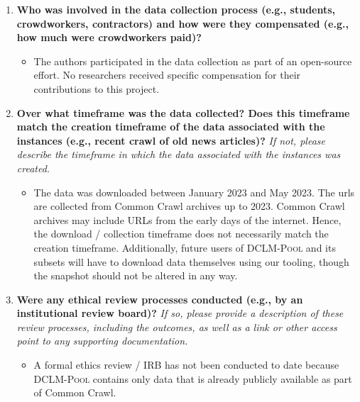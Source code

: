 \documentclass{article}
\newcommand{\rawpool}{\textsc{DCLM-Pool}\xspace}
\newcommand{\commoncrawl}{Common Crawl\xspace}
\begin{document}
\begin{enumerate}[label=Q\arabic*, resume]
\begin{itemize}
\item \rawpool is not a probabilistic sample. As described in Q7, \rawpool contains all data from \commoncrawl before 2023. \commoncrawl is a sample of the Web, and we refer to \commoncrawl documentation for details of their sampling process. Our competition pools for the various scales however are fixed subsets from \rawpool, formed by randomly subsetting \rawpool / Common Crawl paths.
\end{itemize}

\item \textbf{Who was involved in the data collection process (e.g., students, crowdworkers, contractors) and how were they compensated (e.g., how much were crowdworkers paid)?}

\begin{itemize}
\item The authors participated in the data collection as part of an open-source effort. No researchers received specific compensation for their contributions to this project.
\end{itemize}

\item \textbf{Over what timeframe was the data collected? Does this timeframe match the creation timeframe of the data associated with the instances (e.g., recent crawl of old news articles)?} \textit{If not, please describe the timeframe in which the data associated with the instances was created.}

\begin{itemize}
\item The data was downloaded between January 2023 and May 2023. The urls are collected from \commoncrawl archives up to 2023. \commoncrawl archives may include URLs from the early days of the internet. Hence, the download / collection timeframe does not necessarily match the creation timeframe. Additionally, future users of \rawpool and its subsets will have to download data themselves using our tooling, though the snapshot should not be altered in any way.
\end{itemize}

\item \textbf{Were any ethical review processes conducted (e.g., by an institutional review board)?} \textit{If so, please provide a description of these review processes, including the outcomes, as well as a link or other access point to any supporting documentation.}


\begin{itemize}
\item A formal ethics review / IRB has not been conducted to date because \rawpool contains only data that is already publicly available as part of \commoncrawl.
\end{itemize}


\end{enumerate}
\end{document}

